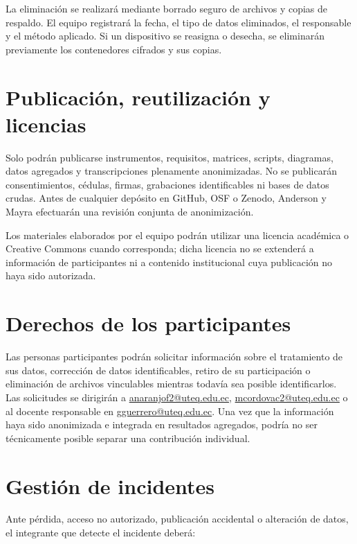 \documentclass[10pt,a4paper]{article}
\makeatletter
\newcommand{\CorreoDocente}{gguerrero@uteq.edu.ec}
\newcommand{\CorreoAnderson}{anaranjof2@uteq.edu.ec}
\newcommand{\CorreoMayra}{mcordovac2@uteq.edu.ec}
\makeatother
\begin{document}
La eliminación se realizará mediante borrado seguro de archivos y copias de respaldo. El equipo registrará la fecha, el tipo de datos eliminados, el responsable y el método aplicado. Si un dispositivo se reasigna o desecha, se eliminarán previamente los contenedores cifrados y sus copias.

\section{Publicación, reutilización y licencias}

Solo podrán publicarse instrumentos, requisitos, matrices, scripts, diagramas, datos agregados y transcripciones plenamente anonimizadas. No se publicarán consentimientos, cédulas, firmas, grabaciones identificables ni bases de datos crudas. Antes de cualquier depósito en GitHub, OSF o Zenodo, Anderson y Mayra efectuarán una revisión conjunta de anonimización.

Los materiales elaborados por el equipo podrán utilizar una licencia académica o Creative Commons cuando corresponda; dicha licencia no se extenderá a información de participantes ni a contenido institucional cuya publicación no haya sido autorizada.

\section{Derechos de los participantes}

Las personas participantes podrán solicitar información sobre el tratamiento de sus datos, corrección de datos identificables, retiro de su participación o eliminación de archivos vinculables mientras todavía sea posible identificarlos. Las solicitudes se dirigirán a \href{mailto:\CorreoAnderson}{\CorreoAnderson}, \href{mailto:\CorreoMayra}{\CorreoMayra} o al docente responsable en \href{mailto:\CorreoDocente}{\CorreoDocente}. Una vez que la información haya sido anonimizada e integrada en resultados agregados, podría no ser técnicamente posible separar una contribución individual.

\section{Gestión de incidentes}

Ante pérdida, acceso no autorizado, publicación accidental o alteración de datos, el integrante que detecte el incidente deberá:
\end{document}
